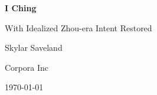 \begin{titlepage}
    \centering
    \vspace*{1in}
    {\Huge\bfseries I Ching \par}
    \vspace{0.5in}
    {\Large With Idealized Zhou-era Intent Restored \par}
    \vspace{1in}
    {\Large Skylar Saveland\par}
    {\Large Corpora Inc\par}
    \vfill
    {\large \today\par}
\end{titlepage}
